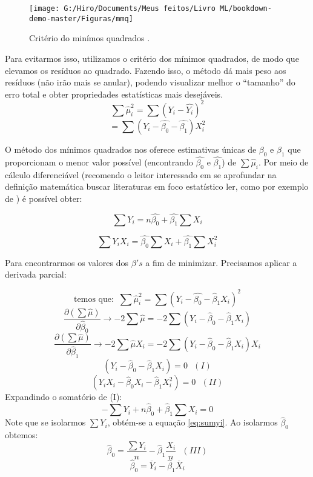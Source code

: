 \documentclass[
]{book}
\begin{document}
\begin{figure}

{\centering \texttt{[image: G:/Hiro/Documents/Meus feitos/Livro ML/bookdown-demo-master/Figuras/mmq]} 

}

\caption{Critério do minímos quadrados \citet{gujarati2011econometria}.}\label{fig:mmq}
\end{figure}



Para evitarmos isso, utilizamos o critério dos mínimos quadrados, de modo que elevamos os resíduos ao quadrado. Fazendo isso, o método dá mais peso aos resíduos (não irão mais se anular), podendo visualizar melhor o ``tamanho'' do erro total e obter propriedades estatísticas mais desejáveis.
\[\sum \hat{\mu}^2_i=\sum(Y_i-\hat{Y_i})^2 \]
\begin{equation}
    = \sum (Y_i-\hat{\beta_0}-\hat{\beta_1})X_i^2 
    \label{eq:mmqeq}
\end{equation}

O método dos mínimos quadrados nos oferece estimativas únicas de \(\beta_0\) e \(\beta_1\) que proporcionam o menor valor possível (encontrando \(\hat{\beta_0}\) e \(\hat{\beta_1}\)) de \(\sum \hat{\mu}_i\). Por meio de cálculo diferenciável (recomendo o leitor interessado em se aprofundar na definição matemática buscar literaturas em foco estatístico ler, como por exemplo de \citet{gujarati2011econometria}) é possível obter:

\begin{equation}
    \sum Y_i=n\hat{\beta_0} + \hat{\beta_1} \sum X_i
    \label{eq:sumyi}
\end{equation}

\begin{equation}
    \sum Y_i X_i=\hat{\beta_0} \sum X_i + \hat{\beta_1} \sum X_i^2
    \label{eq:sumyixi}
\end{equation}

Para encontrarmos os valores dos \(\beta's\) a fim de minimizar. Precisamos aplicar a derivada parcial:

\[\mbox{temos que:  }\ \sum\hat{\mu}_i^2=\sum(Y_i-\hat{\beta_0}-\hat{\beta}_1X_i)^2\]
\[\frac{\partial(\sum\hat{\mu})}{\partial \hat{\beta}_0}\rightarrow-2\sum\hat{\mu}=-2\sum(Y_i-\hat{\beta}_0-\hat{\beta}_1X_i)\]
\[\frac{\partial(\sum\hat{\mu})}{\partial \hat{\beta}_1}\rightarrow-2\sum\hat{\mu}X_i=-2\sum(Y_i-\hat{\beta}_0-\hat{\beta}_1X_i)X_i\]
\[(Y_i-\hat{\beta}_0-\hat{\beta}_1X_i)=0 \ \ \ (I)\]
\[(Y_i X_i-\hat{\beta}_0X_i-\hat{\beta}_1X_i^2)=0 \ \ \ (II)\]
Expandindo o somatório de (I):
\[-\sum Y_i+ n\hat{\beta}_0+\hat{\beta}_1\sum X_i=0\]
Note que se isolarmos \(\sum Y_i\), obtém-se a equação \eqref{eq:sumyi}. Ao isolarmos \(\hat{\beta}_0\) obtemos:
\[\hat{\beta}_0=\frac{\sum Y_i}{n}-\hat{\beta}_1\frac{X_i}{n} \ \ \ (III)\]
\begin{equation}
\hat{\beta}_0=\overline{Y}_i-\hat{\beta}_1\overline{X}_i
\label{eq:betazero}
\end{equation}
\end{document}

